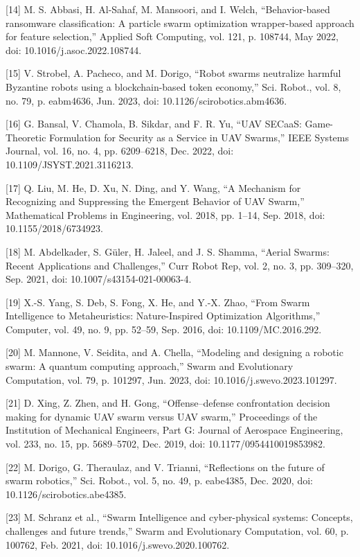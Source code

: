 [14] M. S. Abbasi, H. Al-Sahaf, M. Mansoori, and I. Welch, “Behavior-based ransomware classification: A particle swarm optimization wrapper-based approach for feature selection,” Applied Soft Computing, vol. 121, p. 108744, May 2022, doi: 10.1016/j.asoc.2022.108744.


[15] V. Strobel, A. Pacheco, and M. Dorigo, “Robot swarms neutralize harmful Byzantine robots using a blockchain-based token economy,” Sci. Robot., vol. 8, no. 79, p. eabm4636, Jun. 2023, doi: 10.1126/scirobotics.abm4636.


[16] G. Bansal, V. Chamola, B. Sikdar, and F. R. Yu, “UAV SECaaS: Game-Theoretic Formulation for Security as a Service in UAV Swarms,” IEEE Systems Journal, vol. 16, no. 4, pp. 6209–6218, Dec. 2022, doi: 10.1109/JSYST.2021.3116213.


[17] Q. Liu, M. He, D. Xu, N. Ding, and Y. Wang, “A Mechanism for Recognizing and Suppressing the Emergent Behavior of UAV Swarm,” Mathematical Problems in Engineering, vol. 2018, pp. 1–14, Sep. 2018, doi: 10.1155/2018/6734923.


[18] M. Abdelkader, S. Güler, H. Jaleel, and J. S. Shamma, “Aerial Swarms: Recent Applications and Challenges,” Curr Robot Rep, vol. 2, no. 3, pp. 309–320, Sep. 2021, doi: 10.1007/s43154-021-00063-4.


[19] X.-S. Yang, S. Deb, S. Fong, X. He, and Y.-X. Zhao, “From Swarm Intelligence to Metaheuristics: Nature-Inspired Optimization Algorithms,” Computer, vol. 49, no. 9, pp. 52–59, Sep. 2016, doi: 10.1109/MC.2016.292.


[20] M. Mannone, V. Seidita, and A. Chella, “Modeling and designing a robotic swarm: A quantum computing approach,” Swarm and Evolutionary Computation, vol. 79, p. 101297, Jun. 2023, doi: 10.1016/j.swevo.2023.101297.


[21] D. Xing, Z. Zhen, and H. Gong, “Offense–defense confrontation decision making for dynamic UAV swarm versus UAV swarm,” Proceedings of the Institution of Mechanical Engineers, Part G: Journal of Aerospace Engineering, vol. 233, no. 15, pp. 5689–5702, Dec. 2019, doi: 10.1177/0954410019853982.


[22] M. Dorigo, G. Theraulaz, and V. Trianni, “Reflections on the future of swarm robotics,” Sci. Robot., vol. 5, no. 49, p. eabe4385, Dec. 2020, doi: 10.1126/scirobotics.abe4385.


[23] M. Schranz et al., “Swarm Intelligence and cyber-physical systems: Concepts, challenges and future trends,” Swarm and Evolutionary Computation, vol. 60, p. 100762, Feb. 2021, doi: 10.1016/j.swevo.2020.100762.


